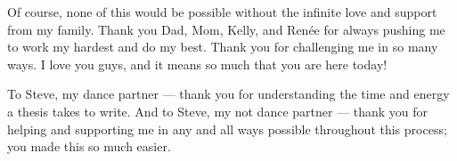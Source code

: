 \begin{preamble}
\begin{acknowledgments}
Of course, none of this would be possible without the infinite love and support 
from my family.  Thank you Dad, Mom, Kelly, and Ren\'{e}e for always pushing me 
to work my hardest and do my best.  Thank you for challenging me in so many 
ways.  I love you guys, and it means so much that you are here today!

To Steve, my dance partner --- thank you for understanding the time and energy 
a thesis takes to write.  And to Steve, my not dance partner --- thank you for 
helping and supporting me in any and all ways possible throughout this process; 
you made this so much easier.
\end{acknowledgments}

\iffinal{}{\newpage}


\tableofcontents

\iffinal{}{\newpage}


\listoftables

\iffinal{}{\newpage}


\listoffigures

\iffinal{}{\newpage}


\begin{abstract}


\end{abstract}
\end{preamble}
